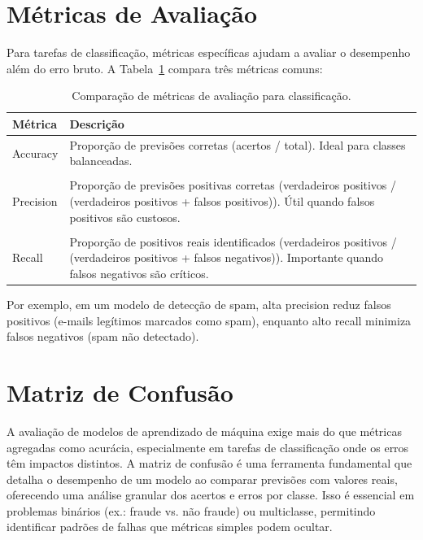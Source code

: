 \documentclass[a4paper,12pt,openany]{book}
\begin{document}
\section{Métricas de Avaliação}

Para tarefas de classificação, métricas específicas ajudam a avaliar o desempenho além do erro bruto. A Tabela~\ref{tab:metricas} compara três métricas comuns:

\begin{table}[H]
\centering
\begin{tabular}{p{3cm} p{8cm}}
\toprule
\textbf{Métrica} & \textbf{Descrição} \\ 
\midrule
Accuracy & Proporção de previsões corretas (acertos / total). Ideal para classes balanceadas. \\
\\
Precision & Proporção de previsões positivas corretas (verdadeiros positivos / (verdadeiros positivos + falsos positivos)). Útil quando falsos positivos são custosos. \\
\\
Recall & Proporção de positivos reais identificados (verdadeiros positivos / (verdadeiros positivos + falsos negativos)). Importante quando falsos negativos são críticos. \\ 
\bottomrule
\end{tabular}
\caption{Comparação de métricas de avaliação para classificação.}
\label{tab:metricas}
\end{table}

Por exemplo, em um modelo de detecção de spam, alta precision reduz falsos positivos (e-mails legítimos marcados como spam), enquanto alto recall minimiza falsos negativos (spam não detectado).

\section{Matriz de Confusão}

A avaliação de modelos de aprendizado de máquina exige mais do que métricas agregadas como acurácia, especialmente em tarefas de classificação onde os erros têm impactos distintos. A matriz de confusão é uma ferramenta fundamental que detalha o desempenho de um modelo ao comparar previsões com valores reais, oferecendo uma análise granular dos acertos e erros por classe. Isso é essencial em problemas binários (ex.: fraude vs. não fraude) ou multiclasse, permitindo identificar padrões de falhas que métricas simples podem ocultar.
\end{document}
